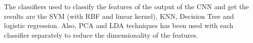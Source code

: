 






The classifiers used to classify the features of the output of the CNN and get the results are the SVM (with RBF and linear kernel), KNN, Decision Tree and logistic regression. Also, PCA and LDA techniques has been used with each classifier separately to reduce the dimensionality of the features.\\

